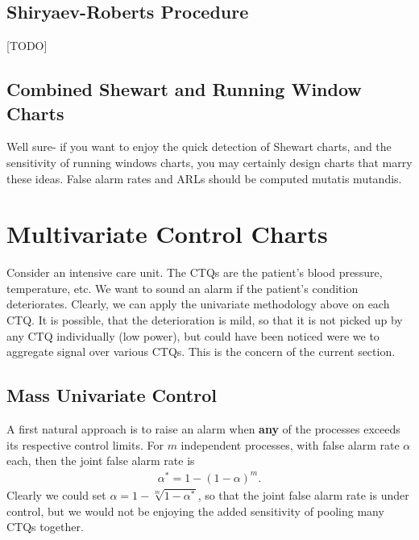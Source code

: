 \subsection{Shiryaev-Roberts Procedure}
[TODO]





\subsection{Combined Shewart and Running Window Charts}
Well sure- if you want to enjoy the quick detection of Shewart charts, and the sensitivity of running windows charts, you may certainly design charts that marry these ideas.
False alarm rates and ARLs should be computed mutatis mutandis.







\section[Multivariate]{Multivariate Control Charts}
\label{sec:multivariate}

\begin{example}
\label{eg:intensive}
Consider an intensive care unit. 
The CTQs are the patient's blood pressure, temperature, etc.
We want to sound an alarm if the patient's condition deteriorates. 
Clearly, we can apply the univariate methodology above on each CTQ.
It is possible, that the deterioration is mild, so that it is not picked up by any CTQ individually (low power), but could have been noticed were we to aggregate signal over various CTQs. 
This is the concern of the current section. 
\end{example}


\subsection{Mass Univariate Control}
\label{sec:mass_univariate}

A first natural approach is to raise an alarm when \textbf{any} of the processes exceeds its respective control limits.
For $m$ independent processes, with false alarm rate $\alpha$ each, then the joint false alarm rate is 
\begin{align}
	\alpha^* = 1-(1-\alpha)^m.
\end{align}
Clearly we could set $\alpha=1-\sqrt[m]{1-\alpha^*}$, so that the joint false alarm rate is under control, but we would not be enjoying the added sensitivity of pooling many CTQs together. 



